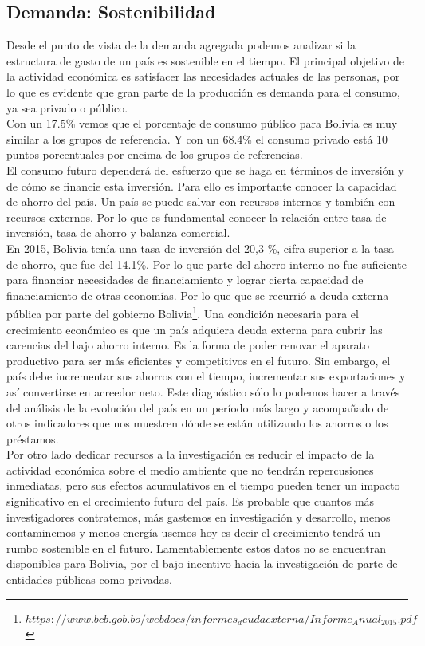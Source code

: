     \subsection{Demanda: Sostenibilidad}
    Desde el punto de vista de la demanda agregada podemos analizar si la estructura de gasto de un país es sostenible en el tiempo. El principal objetivo de la actividad económica es satisfacer las necesidades actuales de las personas, por lo que es evidente que gran parte de la producción es demanda para el consumo, ya sea privado o público.\\
    Con un 17.5\% vemos que el porcentaje de consumo público para Bolivia es muy similar a los grupos de referencia. Y con un 68.4\% el consumo privado está 10 puntos porcentuales por encima de los grupos de referencias.\\
    El consumo futuro dependerá del esfuerzo que se haga en términos de inversión y de cómo se financie esta inversión. Para ello es importante conocer la capacidad de ahorro del país. Un país se puede salvar con recursos internos y también con recursos externos. Por lo que es fundamental conocer la relación entre tasa de inversión, tasa de ahorro y balanza comercial.\\
    En 2015, Bolivia tenía una tasa de inversión del 20,3 \%, cifra superior a la tasa de ahorro, que fue del 14.1\%. Por lo que parte del ahorro interno no fue suficiente para financiar necesidades de financiamiento y lograr cierta capacidad de financiamiento de otras economías. Por lo que que se recurrió a deuda externa pública por parte del gobierno Bolivia\footnote{$https://www.bcb.gob.bo/webdocs/informes_deudaexterna/Informe_Anual_2015.pdf$}.
    Una condición necesaria para el crecimiento económico es que un país adquiera deuda externa para cubrir las carencias del bajo ahorro interno. Es la forma de poder renovar el aparato productivo para ser más eficientes y competitivos en el futuro. Sin embargo, el país debe incrementar sus ahorros con el tiempo, incrementar sus exportaciones y así convertirse en acreedor neto. Este diagnóstico sólo lo podemos hacer a través del análisis de la evolución del país en un período más largo y acompañado de otros indicadores que nos muestren dónde se están utilizando los ahorros o los préstamos.\\
    Por otro lado dedicar recursos a la investigación es reducir el impacto de la actividad económica sobre el medio ambiente que no tendrán  repercusiones inmediatas, pero sus efectos acumulativos en el tiempo pueden tener un impacto significativo en el crecimiento futuro del país. Es probable que cuantos más investigadores contratemos, más gastemos en investigación y desarrollo, menos contaminemos y menos energía usemos hoy es decir el crecimiento tendrá un rumbo sostenible en el futuro. Lamentablemente estos datos no se encuentran disponibles para Bolivia, por el bajo incentivo hacia la investigación de parte de entidades públicas como privadas.\\

